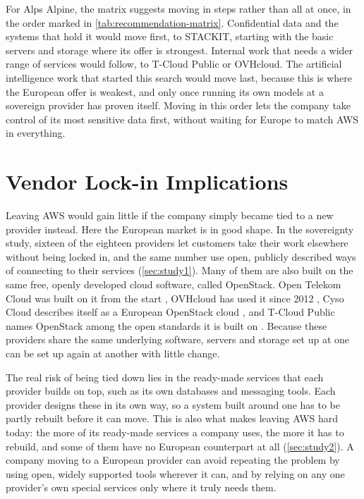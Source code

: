 For Alps Alpine, the matrix suggests moving in steps rather than all at once, in
the order marked in \cref{tab:recommendation-matrix}. Confidential data and the
systems that hold it would move first, to STACKIT, starting with the basic servers
and storage where its offer is strongest. Internal work that needs a wider range
of services would follow, to T-Cloud Public or OVHcloud. The artificial
intelligence work that started this search would move last, because this is where
the European offer is weakest, and only once running its own models at a
sovereign provider has proven itself. Moving in this order lets the company take
control of its most sensitive data first, without waiting for Europe to match
\acs{AWS} in everything.

\section{Vendor Lock-in Implications}
\label{sec:lockin}

Leaving \acs{AWS} would gain little if the company simply became tied to a new
provider instead. Here the European market is in good shape. In the sovereignty
study, sixteen of the eighteen providers let customers take their work elsewhere
without being locked in, and the same number use open, publicly described ways of
connecting to their services (\cref{sec:study1}). Many of them are also built on
the same free, openly developed cloud software, called OpenStack. Open Telekom
Cloud was built on it from the start \cite{OTC_GoesLive_2016}, OVHcloud has used it
since 2012 \cite{OVHcloud_OpenStack}, Cyso Cloud describes itself as a European
OpenStack cloud \cite{FugaCloud_About}, and T-Cloud Public names OpenStack among
the open standards it is built on \cite{TCloudPublic_Sovereignty}. Because these
providers share the same underlying software, servers and storage set up at one
can be set up again at another with little change.

The real risk of being tied down lies in the ready-made services that each
provider builds on top, such as its own databases and messaging tools. Each
provider designs these in its own way, so a system built around one has to be
partly rebuilt before it can move. This is also what makes leaving \acs{AWS} hard
today: the more of its ready-made services a company uses, the more it has to
rebuild, and some of them have no European counterpart at all (\cref{sec:study2}).
A company moving to a European provider can avoid repeating the problem by using
open, widely supported tools wherever it can, and by relying on any one provider's
own special services only where it truly needs them.

